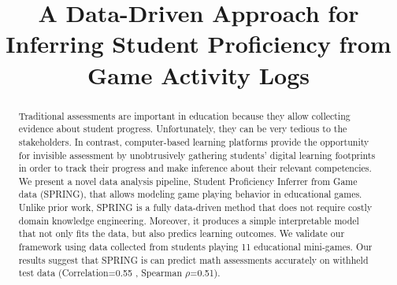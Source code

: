 \documentclass{sigchi}
\def\algname{SPRING\xspace}
\def\plaintitle{A Data-Driven Approach for Inferring Student Proficiency from Game Activity Logs  }
\begin{document}
\title{\plaintitle}

\author
{%
}

  
\maketitle

\begin{abstract}
Traditional assessments are important in education because they allow collecting evidence about student progress. 
Unfortunately, they can be very tedious to the stakeholders.
In contrast, computer-based learning platforms provide the opportunity for invisible assessment by unobtrusively gathering students' digital learning footprints in order to track their progress and make inference about their relevant competencies.
We present a novel data analysis pipeline, {Student Proficiency Inferrer from Game data} (\algname), that allows modeling  game playing behavior in educational games.
Unlike prior work, \algname is a fully data-driven method that does not require costly domain knowledge engineering.
Moreover, it produces a simple interpretable model that not only fits the data, but also predics learning outcomes.
We validate our framework using data collected from students playing 11 educational mini-games.
Our results suggest that \algname is can predict math assessments accurately on withheld test data (Correlation=0.55 , Spearman $\rho$=0.51).
\end{abstract}
\end{document}
